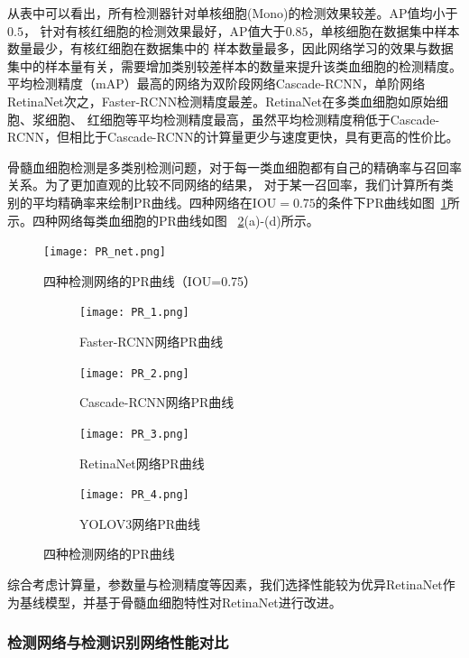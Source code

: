 从表中可以看出，所有检测器针对单核细胞(Mono)的检测效果较差。$\text{AP}$值均小于$0.5$，
针对有核红细胞的检测效果最好，$\text{AP}$值大于$0.85$，单核细胞在数据集中样本数量最少，有核红细胞在数据集中的
样本数量最多，因此网络学习的效果与数据集中的样本量有关，需要增加类别较差样本的数量来提升该类血细胞的检测精度。
平均检测精度（mAP）最高的网络为双阶段网络Cascade-RCNN，单阶网络RetinaNet次之，Faster-RCNN检测精度最差。RetinaNet在多类血细胞如原始细胞、浆细胞、
红细胞等平均检测精度最高，虽然平均检测精度稍低于Cascade-RCNN，但相比于Cascade-RCNN的计算量更少与速度更快，具有更高的性价比。

骨髓血细胞检测是多类别检测问题，对于每一类血细胞都有自己的精确率与召回率关系。为了更加直观的比较不同网络的结果，
对于某一召回率，我们计算所有类别的平均精确率来绘制PR曲线。四种网络在$\text{IOU}=0.75$的条件下PR曲线如图~\ref{fig:pr_net}所示。四种网络每类血细胞的PR曲线如图
~\ref{fig:pr_curve}(a)-(d)所示。
\begin{figure}[htbp]                     
  \centering                      
  \texttt{[image: PR\_net.png]}                      
  \caption{四种检测网络的PR曲线（IOU=0.75）}                      
  \label{fig:pr_net}       
\end{figure}   

\begin{figure}[htbp]
	\centering
	\begin{subfigure}{0.48\linewidth}
		\centering
		\texttt{[image: PR\_1.png]}
    \caption{Faster-RCNN网络PR曲线}
	\end{subfigure}
	\centering
	\begin{subfigure}{0.48\linewidth}
		\centering
		\texttt{[image: PR\_2.png]}
    \caption{Cascade-RCNN网络PR曲线}
	\end{subfigure}
	\centering
	\begin{subfigure}{0.48\linewidth}
		\centering
		\texttt{[image: PR\_3.png]}
    \caption{RetinaNet网络PR曲线}
	\end{subfigure}
	\centering
	\begin{subfigure}{0.48\linewidth}
		\centering
		\texttt{[image: PR\_4.png]}
    \caption{YOLOV3网络PR曲线}
	\end{subfigure}
	\caption{四种检测网络的PR曲线}
	\label{fig:pr_curve}
\end{figure}

综合考虑计算量，参数量与检测精度等因素，我们选择性能较为优异RetinaNet作为基线模型，并基于骨髓血细胞特性对RetinaNet进行改进。

\subsubsection{检测网络与检测识别网络性能对比}

